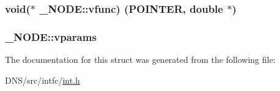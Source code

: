 \subsubsection[{\texorpdfstring{vfunc}{vfunc}}]{\setlength{\rightskip}{0pt plus 5cm}void($\ast$ \+\_\+\+N\+O\+D\+E\+::vfunc) ({\bf P\+O\+I\+N\+T\+ER}, double $\ast$)}\hypertarget{struct___n_o_d_e_a9a4b0ffe9fdecc55e31dfea88e32c7cb}{}\label{struct___n_o_d_e_a9a4b0ffe9fdecc55e31dfea88e32c7cb}
\subsubsection[{\texorpdfstring{vparams}{vparams}}]{ \+\_\+\+N\+O\+D\+E\+::vparams}\hypertarget{struct___n_o_d_e_aff7e5f27a978ad5b932267812ce9e247}{}\label{struct___n_o_d_e_aff7e5f27a978ad5b932267812ce9e247}


The documentation for this struct was generated from the following file\+:\begin{DoxyCompactItemize}
\item 
D\+N\+S/src/intfc/\hyperlink{int_8h}{int.\+h}\end{DoxyCompactItemize}
